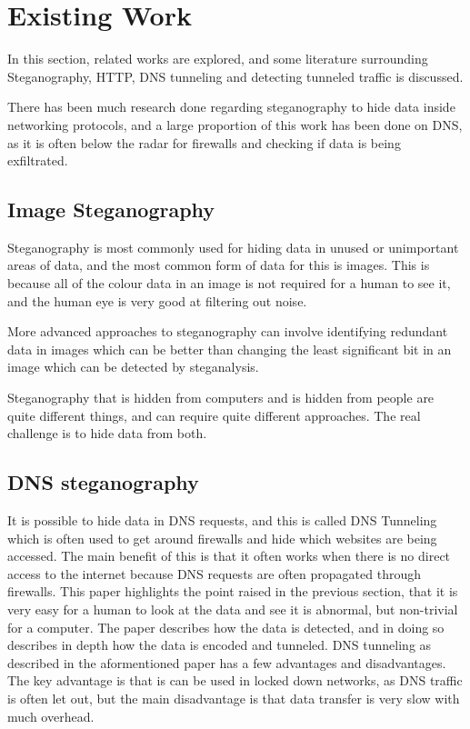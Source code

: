 \section{Existing Work}
In this section, related works are explored, and some literature surrounding Steganography, HTTP, DNS tunneling and detecting tunneled traffic is discussed.

There has been much research done regarding steganography to hide data inside networking protocols, and a large proportion of this work has been done on DNS, as it is often below the radar for firewalls and checking if data is being exfiltrated.
\subsection{Image Steganography}
Steganography is most commonly used for hiding data in unused or unimportant areas of data\cite{exploringsteno}, and the most common form of data for this is images. This is because all of the colour data in an image is not required for a human to see it, and the human eye is very good at filtering out noise.

More advanced approaches to steganography can involve identifying redundant data in images\cite{introsteno} which can be better than changing the least significant bit in an image which can be detected by steganalysis.

Steganography that is hidden from computers and is hidden from people are quite different things, and can require quite different approaches. The real challenge is to hide data from both.

\subsection{DNS steganography}
It is possible to hide data in DNS requests, and this is called DNS Tunneling which is often used to get around firewalls and hide which websites are being accessed\cite{detectingdns}. The main benefit of this is that it often works when there is no direct access to the internet because DNS requests are often propagated through firewalls.
This paper highlights the point raised in the previous section, that it is very easy for a human to look at the data and see it is abnormal, but non-trivial for a computer.
The paper describes how the data is detected, and in doing so describes in depth how the data is encoded and tunneled.
DNS tunneling as described in the aformentioned paper has a few advantages and disadvantages.
The key advantage is that is can be used in locked down networks, as DNS traffic is often let out, but the main disadvantage is that data transfer is very slow with much overhead.

